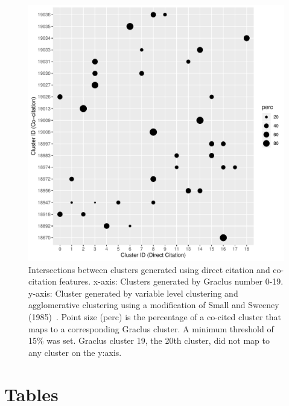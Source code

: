 \begin{figure}[ht]
\centering
  \includegraphics[scale=0.45]{graclus_cocit_fig.pdf}
\caption{Intersections between clusters generated using direct citation and co-citation features. x-axis: Clusters generated by Graclus number 0-19. y-axis: Cluster generated by variable level clustering and agglomerative clustering using a modification of Small and Sweeney (1985)~\cite{small_clustering_1985}. Point size (perc) is the percentage of a co-cited cluster that maps to a corresponding Graclus cluster. A minimum threshold of 15\% was set. Graclus cluster 19, the 20th cluster, did not map to any cluster on the y:axis.}
\label{fig:graclus_cocit_fig}       %
\end{figure}
\newpage
\clearpage
\section*{Tables}


